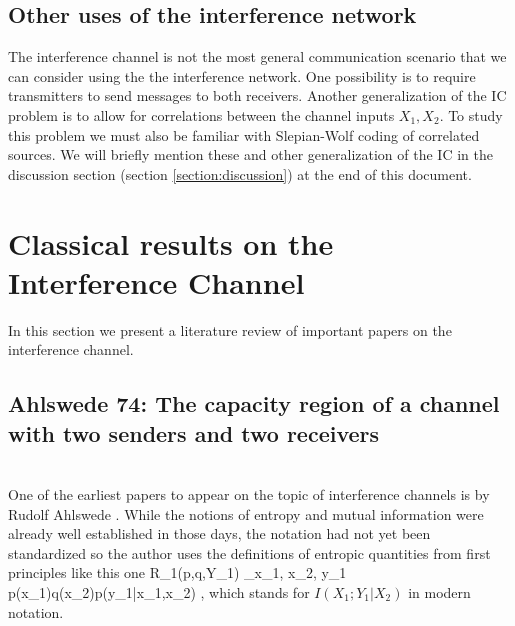 \documentclass[aps,11pt,twoside,letterpaper]{article}
\begin{document}
    \subsection{Other uses of the interference network}

        The interference channel is not the most general communication scenario
        that we can consider using the the interference network.
        One possibility is to require transmitters to send messages to both
        receivers.
        Another generalization %
        of the IC problem is to allow for correlations between the channel inputs $X_1,X_2$.
        To study this problem we must also be familiar with Slepian-Wolf
        coding of correlated sources. 
        We will briefly mention these and other generalization of the IC in the discussion
        section (section  \ref{section:discussion}) at the end of this document.

        




\section{Classical results on the Interference Channel}   \label{section:lit-review}

    
    In this section we present a literature review of important papers 
    on the interference channel.
    



        \subsection{Ahlswede 74: The capacity region of a channel with two senders and two receivers} \ \\
        
            One of the earliest papers to appear on the topic of interference channels is by Rudolf Ahlswede \cite{Ahlswede1974}.
            While the notions of entropy and mutual information were already well established in those days, 
            the notation had not yet been standardized so the author uses the definitions of entropic 
            quantities from first principles like this one
            \be
                R_1(p,q,Y_1) \triangleq
                    \sum_{x_1, x_2, y_1} 
                        p(x_1)q(x_2)p(y_1|x_1,x_2) 
                        \log {},
            \ee
            which stands for $I(X_1;Y_1|X_2)$ in modern notation.
\end{document}
